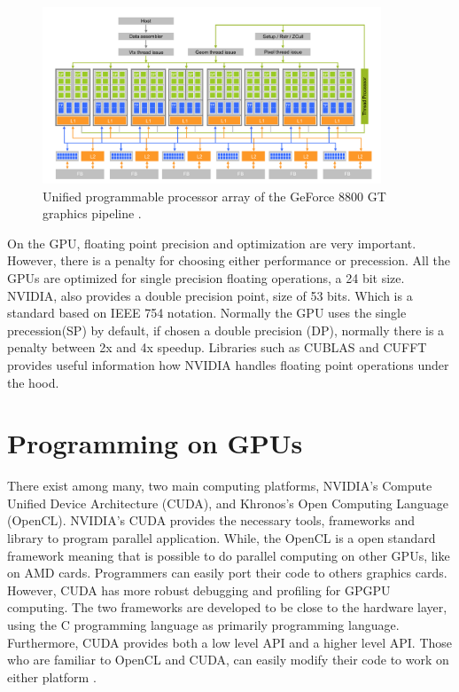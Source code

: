 \begin{figure}[htbp]
	\centering
		\includegraphics[width=0.9\textwidth]{Figures/arch.png}
		\smallskip
	\caption[NVIDIA's GPU architecture]{Unified programmable processor array of the GeForce 8800 GT graphics pipeline \cite{hwu}.}
	\label{fig:arch}
\end{figure}

On the GPU, floating point precision and optimization are very important. However, there is a penalty for choosing either performance or precession. All the GPUs are optimized for single precision floating operations, a 24 bit size. NVIDIA, also provides a double precision point, size of  53 bits. Which is a standard based on  IEEE 754 notation. Normally the GPU uses the single precession(SP) by default, if chosen a double precision (DP), normally there is a penalty between 2x and 4x speedup\cite{precision}. Libraries such as CUBLAS and CUFFT provides useful information how NVIDIA handles floating point operations under the hood.

\section{Programming on GPUs}

There exist among many, two main computing platforms, NVIDIA's Compute Unified Device Architecture (CUDA), and Khronos's Open Computing Language (OpenCL). NVIDIA's CUDA provides the necessary tools, frameworks and library to program parallel application. While, the OpenCL is a open standard framework meaning that is possible to do parallel computing on other GPUs, like on AMD cards. Programmers can easily port their code to others graphics cards.  However, CUDA has more robust debugging and profiling for GPGPU computing. The two frameworks are developed to be close to the hardware layer, using the C programming language as primarily programming language. Furthermore, CUDA provides both a low level API and a higher level API. Those who are familiar to OpenCL and CUDA, can easily modify their code to work on either platform \cite{hwu}.

